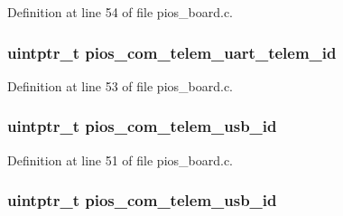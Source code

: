 Definition at line 54 of file pios\-\_\-board.\-c.

\hypertarget{group___open_pilot_core_ga921f0eb0351c5bfb72fa30333cd8dbe1}{
\subsubsection[{pios\-\_\-com\-\_\-telem\-\_\-uart\-\_\-telem\-\_\-id}]{\setlength{\rightskip}{0pt plus 5cm}uintptr\-\_\-t pios\-\_\-com\-\_\-telem\-\_\-uart\-\_\-telem\-\_\-id}}\label{group___open_pilot_core_ga921f0eb0351c5bfb72fa30333cd8dbe1}


Definition at line 53 of file pios\-\_\-board.\-c.

\hypertarget{group___open_pilot_core_ga513cc36d72b76de2fcb75ff233a79a4a}{
\subsubsection[{pios\-\_\-com\-\_\-telem\-\_\-usb\-\_\-id}]{\setlength{\rightskip}{0pt plus 5cm}uintptr\-\_\-t pios\-\_\-com\-\_\-telem\-\_\-usb\-\_\-id}}\label{group___open_pilot_core_ga513cc36d72b76de2fcb75ff233a79a4a}


Definition at line 51 of file pios\-\_\-board.\-c.

\hypertarget{group___open_pilot_core_ga513cc36d72b76de2fcb75ff233a79a4a}{
\subsubsection[{pios\-\_\-com\-\_\-telem\-\_\-usb\-\_\-id}]{\setlength{\rightskip}{0pt plus 5cm}uintptr\-\_\-t pios\-\_\-com\-\_\-telem\-\_\-usb\-\_\-id}}\label{group___open_pilot_core_ga513cc36d72b76de2fcb75ff233a79a4a}



